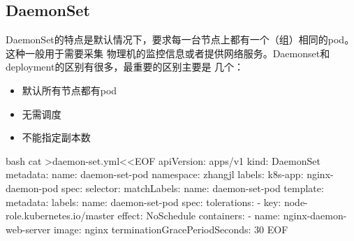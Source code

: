 \subsection{DaemonSet}
DaemonSet的特点是默认情况下，要求每一台节点上都有一个（组）相同的pod。这种一般用于需要采集
物理机的监控信息或者提供网络服务。Daemonset和deployment的区别有很多，最重要的区别主要是
几个：
\begin{itemize}
    \item 默认所有节点都有pod
    \item 无需调度
    \item 不能指定副本数
\end{itemize}
\begin{code-block}{bash}
cat >daemon-set.yml<<EOF
apiVersion: apps/v1
kind: DaemonSet
metadata:
  name: daemon-set-pod
  namespace: zhangjl
  labels:
    k8s-app: nginx-daemon-pod
spec:
  selector:
    matchLabels:
      name: daemon-set-pod
  template:
    metadata:
      labels:
        name: daemon-set-pod
    spec:
      tolerations:
      - key: node-role.kubernetes.io/master
        effect: NoSchedule
      containers:
      - name: nginx-daemon-web-server
        image: nginx
      terminationGracePeriodSeconds: 30
EOF
\end{code-block}